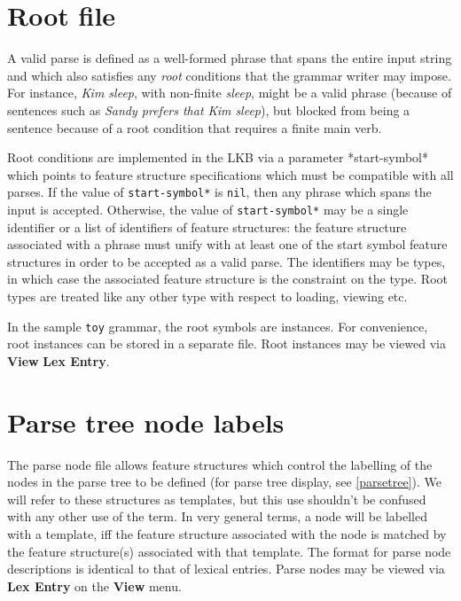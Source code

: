 \documentclass[12pt]{report}
\begin{document}
\section{Root file}
\label{root}

A valid parse is defined as a well-formed phrase that spans the entire
input string and which also satisfies any {\it root} conditions
that the grammar writer may impose.  For instance,  {\it Kim sleep},
with non-finite {\it sleep},
might be a valid phrase (because
of sentences such as {\it Sandy prefers that Kim sleep}), but blocked
from being a sentence because of a root condition that requires a finite
main verb.  

Root conditions are implemented in the LKB via a
parameter *start-symbol* which points to feature structure specifications
which must be compatible with all parses.  If the value of {\tt *start-symbol*}
is {\tt nil}, then any phrase which spans the input is accepted.
Otherwise,
the value of {\tt *start-symbol*}
may be a single identifier or a list of identifiers of feature
structures: the feature structure associated with a phrase must unify
with at least one of the start symbol feature structures in order
to be accepted as a valid parse.  The identifiers may be types, in which
case the associated feature structure is the constraint on the
type.  Root types are treated like any other type with respect to loading,
viewing etc.
 
In the sample {\tt toy} grammar, the root symbols are 
instances.  For convenience, root instances
can be stored in a separate file.
Root instances may be viewed via {\bf View} 
{\bf Lex Entry}.

\section{Parse tree node labels}
\label{treenodes}

The parse node file allows feature structures which control the
labelling of the nodes in the
parse tree to be defined (for parse tree display, see \ref{parsetree}).
We will refer to these structures as templates, but this use 
shouldn't be confused with any other use of the term.
In very general terms,
a node will be labelled with a template, iff the feature
structure associated with the node is matched by the feature
structure(s) associated with that template.
The format for parse node descriptions is
identical to that of lexical entries.  Parse nodes may be viewed via 
{\bf Lex Entry} on the {\bf View} menu.
\end{document}
